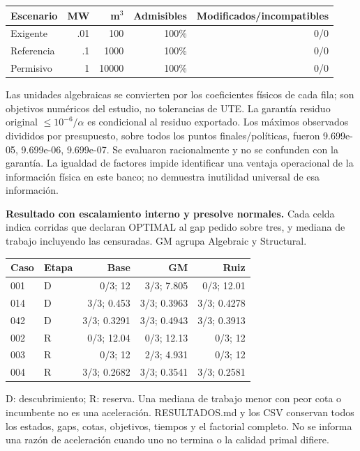 \documentclass[11pt,a4paper]{article}
\begin{document}
\begin{center}\begin{tabular}{lrrrr}\toprule
Escenario & MW & m$^3$ & Admisibles & Modificados/incompatibles\\\midrule
Exigente & .01 & 100 & 100\% & 0/0\\
Referencia & .1 & 1000 & 100\% & 0/0\\
Permisivo & 1 & 10000 & 100\% & 0/0\\\bottomrule
\end{tabular}\end{center}
Las unidades algebraicas se convierten por los coeficientes físicos de cada
fila; son objetivos numéricos del estudio, no tolerancias de UTE. La garantía
residuo original $\leq10^{-6}/\alpha$ es condicional al residuo exportado.
Los máximos observados divididos por presupuesto, sobre todos los puntos
finales/políticas, fueron 9.699e-05, 9.699e-06, 9.699e-07. Se evaluaron racionalmente y no se confunden
con la garantía. La igualdad de factores impide identificar una ventaja
operacional de la información física en este banco; no demuestra inutilidad
universal de esa información.

\newpage
\textbf{Resultado con escalamiento interno y presolve normales.}
Cada celda indica corridas que declaran OPTIMAL al gap pedido sobre tres, y
mediana de trabajo incluyendo las censuradas. GM agrupa Algebraic y Structural.

\begin{center}\begin{tabular}{llrrr}\toprule
Caso & Etapa & Base & GM & Ruiz\\\midrule
001 & D & 0/3; 12 & 3/3; 7.805 & 0/3; 12.01 \\
014 & D & 3/3; 0.453 & 3/3; 0.3963 & 3/3; 0.4278 \\
042 & D & 3/3; 0.3291 & 3/3; 0.4943 & 3/3; 0.3913 \\
002 & R & 0/3; 12.04 & 0/3; 12.13 & 0/3; 12 \\
003 & R & 0/3; 12 & 2/3; 4.931 & 0/3; 12 \\
004 & R & 3/3; 0.2682 & 3/3; 0.3541 & 3/3; 0.2581 \\
\bottomrule\end{tabular}\end{center}
D: descubrimiento; R: reserva. Una mediana de trabajo menor con peor cota o
incumbente no es una aceleración. RESULTADOS.md y los CSV conservan todos los
estados, gaps, cotas, objetivos, tiempos y el factorial completo. No se informa
una razón de aceleración cuando uno no termina o la calidad primal difiere.
\end{document}
